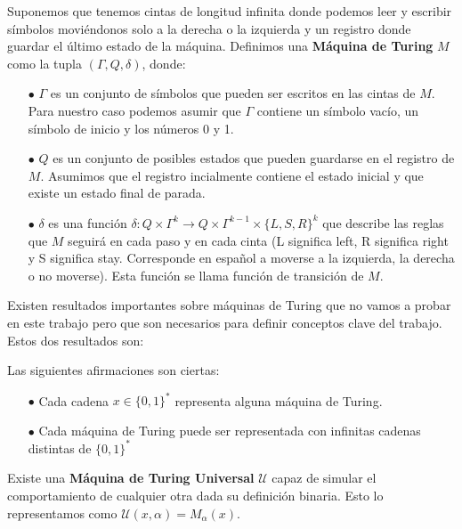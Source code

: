 \begin{definicion}
Suponemos que tenemos cintas de longitud infinita donde podemos leer y escribir símbolos moviéndonos solo a la derecha o la izquierda y un registro donde guardar el último estado de la máquina. Definimos una \textbf{Máquina de Turing} $M$ como la tupla $(\Gamma, Q, \delta)$, donde:
\begin{itemize}
    \item[$\bullet$] $\Gamma$ es un conjunto de símbolos que pueden ser escritos en las cintas de $M$. Para nuestro caso podemos asumir que $\Gamma$ contiene un símbolo vacío, un símbolo de inicio y los números 0 y 1.
    \item[$\bullet$] $Q$ es un conjunto de posibles estados que pueden guardarse en el registro de $M$. Asumimos que el registro incialmente contiene el estado inicial y que existe un estado final de parada.
    \item[$\bullet$] $\delta$ es una función $\delta: Q \times \Gamma^{k} \rightarrow Q \times \Gamma^{k-1} \times \{L,S,R\}^{k}$ que describe las reglas que $M$ seguirá en cada paso y en cada cinta (L significa left, R significa right y S significa stay. Corresponde en español a moverse a la izquierda, la derecha o no moverse). Esta función se llama función de transición de $M$.
\end{itemize}
\end{definicion}
Existen resultados importantes sobre máquinas de Turing que no vamos a probar en este trabajo pero que son necesarios para definir conceptos clave del trabajo. Estos dos resultados son:

\begin{proposicion}
Las siguientes afirmaciones son ciertas:
\begin{itemize}
    \item[$\bullet$] Cada cadena $x \in \{0,1\}^*$ representa alguna máquina de Turing.
    \item[$\bullet$] Cada máquina de Turing puede ser representada con infinitas cadenas distintas de $\{0,1\}^*$
\end{itemize}
\end{proposicion}

\begin{proposicion}
Existe una \textbf{Máquina de Turing Universal} $\mathcal{U}$ capaz de simular el comportamiento de cualquier otra dada su definición binaria. Esto lo representamos como $\mathcal{U}(x,\alpha) = M_{\alpha}(x)$.
\end{proposicion}

